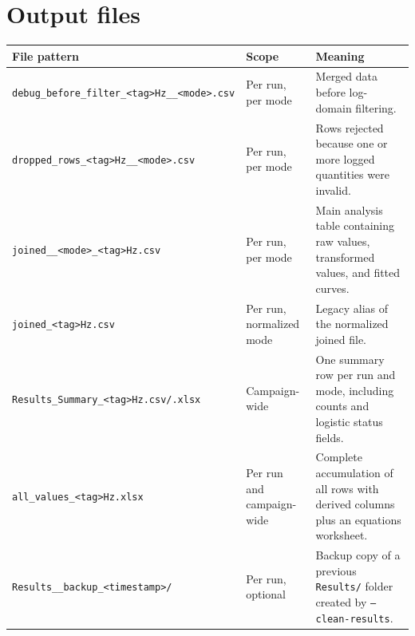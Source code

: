 \documentclass[11pt]{article}
\begin{document}
\section{Output files}
\begin{longtable}{p{} p{} p{}}
\toprule
\textbf{File pattern} & \textbf{Scope} & \textbf{Meaning}\\
\midrule
\endhead
\texttt{debug\_before\_filter\_<tag>Hz\_\_<mode>.csv} & Per run, per mode & Merged data before log-domain filtering.\\
\texttt{dropped\_rows\_<tag>Hz\_\_<mode>.csv} & Per run, per mode & Rows rejected because one or more logged quantities were invalid.\\
\texttt{joined\_\_<mode>\_<tag>Hz.csv} & Per run, per mode & Main analysis table containing raw values, transformed values, and fitted curves.\\
\texttt{joined\_<tag>Hz.csv} & Per run, normalized mode & Legacy alias of the normalized joined file.\\
\texttt{Results\_Summary\_<tag>Hz.csv/.xlsx} & Campaign-wide & One summary row per run and mode, including counts and logistic status fields.\\
\texttt{all\_values\_<tag>Hz.xlsx} & Per run and campaign-wide & Complete accumulation of all rows with derived columns plus an equations worksheet.\\
\texttt{Results\_\_backup\_<timestamp>/} & Per run, optional & Backup copy of a previous \texttt{Results/} folder created by \texttt{--clean-results}.\\
\bottomrule
\end{longtable}
\end{document}
